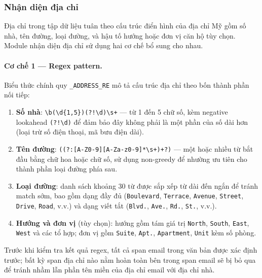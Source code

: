 \subsubsection{Nhận diện địa chỉ}

Địa chỉ trong tập dữ liệu tuân theo cấu trúc điển hình của địa chỉ Mỹ gồm
số nhà, tên đường, loại đường, và hậu tố hướng hoặc đơn vị căn hộ tùy chọn.
Module nhận diện địa chỉ sử dụng hai cơ chế bổ sung cho nhau.

\paragraph{Cơ chế 1 --- Regex pattern.}
Biểu thức chính quy \texttt{\_ADDRESS\_RE} mô tả cấu trúc địa chỉ theo bốn
thành phần nối tiếp:

\begin{enumerate}[nosep]
    \item \textbf{Số nhà}: \verb|\b(\d{1,5})(?!\d)\s+| ---
          từ 1 đến 5 chữ số, kèm negative lookahead \verb|(?!\d)| để đảm
          bảo đây không phải là một phần của số dài hơn (loại trừ số điện
          thoại, mã bưu điện dài).

    \item \textbf{Tên đường}: \verb|((?:[A-Z0-9][A-Za-z0-9]*\s+)+?)| ---
          một hoặc nhiều từ bắt đầu bằng chữ hoa hoặc chữ số, sử dụng
          non-greedy để nhường ưu tiên cho thành phần loại đường phía sau.

    \item \textbf{Loại đường}: danh sách khoảng 30 từ được sắp xếp từ dài
          đến ngắn để tránh match sớm, bao gồm dạng đầy đủ
          (\texttt{Boulevard}, \texttt{Terrace}, \texttt{Avenue},
          \texttt{Street}, \texttt{Drive}, \texttt{Road}, v.v.) và dạng viết
          tắt (\texttt{Blvd.}, \texttt{Ave.}, \texttt{Rd.}, \texttt{St.}, v.v.).

    \item \textbf{Hướng và đơn vị} (tùy chọn):
          hướng gồm tám giá trị \texttt{North}, \texttt{South}, \texttt{East},
          \texttt{West} và các tổ hợp; đơn vị gồm \texttt{Suite},
          \texttt{Apt.}, \texttt{Apartment}, \texttt{Unit} kèm số phòng.
\end{enumerate}

Trước khi kiểm tra kết quả regex, tất cả span email trong văn bản được xác định
trước; bất kỳ span địa chỉ nào nằm hoàn toàn bên trong span email sẽ bị bỏ qua
để tránh nhầm lẫn phần tên miền của địa chỉ email với địa chỉ nhà.

